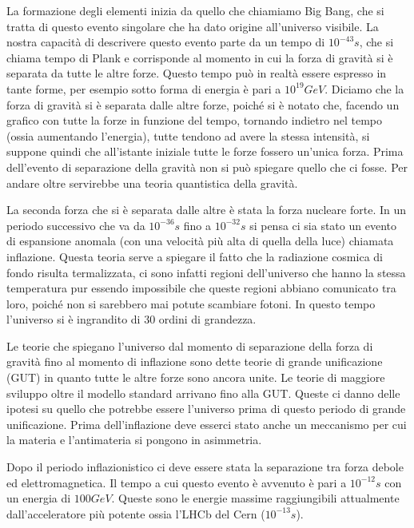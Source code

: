 La formazione degli elementi inizia da quello che chiamiamo Big Bang, che si tratta di questo evento singolare che ha dato origine all'universo visibile.
La nostra capacità di descrivere questo evento parte da un tempo di $10^{-43}s$, che si chiama tempo di Plank e corrisponde al momento in cui la forza di gravità si è separata da tutte le altre forze.
Questo tempo può in realtà essere espresso in tante forme, per esempio sotto forma di energia è pari a $10^{19}GeV$.
Diciamo che la forza di gravità si è separata dalle altre forze, poiché si è notato che, facendo un grafico con tutte la forze in funzione del tempo, tornando indietro nel tempo (ossia aumentando l'energia), tutte tendono ad avere la stessa intensità, si suppone quindi che all'istante iniziale tutte le forze fossero un'unica forza.
Prima dell'evento di separazione della gravità non si può spiegare quello che ci fosse.
Per andare oltre servirebbe una teoria quantistica della gravità.

La seconda forza che si è separata dalle altre è stata la forza nucleare forte.
In un periodo successivo che va da $10^{-36}s$ fino a $10^{-32}s$ si pensa ci sia stato un evento di espansione anomala (con una velocità più alta di quella della luce) chiamata inflazione.
Questa teoria serve a spiegare il fatto che la radiazione cosmica di fondo risulta termalizzata, ci sono infatti regioni dell'universo che hanno la stessa temperatura pur essendo impossibile che queste regioni abbiano comunicato tra loro, poiché non si sarebbero mai potute scambiare fotoni.
In questo tempo l'universo si è ingrandito di $30$ ordini di grandezza.

Le teorie che spiegano l'universo dal momento di separazione della forza di gravità fino al momento di inflazione sono dette teorie di grande unificazione (GUT) in quanto tutte le altre forze sono ancora unite.
Le teorie di maggiore sviluppo oltre il modello standard arrivano fino alla GUT.
Queste ci danno delle ipotesi su quello che potrebbe essere l'universo prima di questo periodo di grande unificazione.
Prima dell'inflazione deve esserci stato anche un meccanismo per cui la materia e l'antimateria si pongono in asimmetria.

Dopo il periodo inflazionistico ci deve essere stata la separazione tra forza debole ed elettromagnetica.
Il tempo a cui questo evento è avvenuto è pari a $10^{-12}s$ con un energia di $100GeV$.
Queste sono le energie massime raggiungibili attualmente dall'acceleratore più potente ossia l'LHCb del Cern ($10^{-13}s$).

